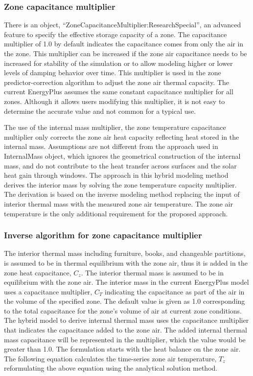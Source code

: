 \subsubsection{Zone capacitance multiplier}\label{zone-capacitance-multiplier}

There is an object, ``ZoneCapacitanceMultiplier:ResearchSpecial'', an advanced feature to specify the effective storage capacity of a zone. The capacitance multiplier of 1.0 by default indicates the capacitance comes from only the air in the zone. This multiplier can be increased if the zone air capacitance needs to be increased for stability of the simulation or to allow modeling higher or lower levels of damping behavior over time. This multiplier is used in the zone predictor-correction algorithm to adjust the zone air thermal capacity. The current EnergyPlus assumes the same constant capacitance multiplier for all zones. Although it allows users modifying this multiplier, it is not easy to determine the accurate value and not common for a typical use.

The use of the internal mass multiplier, the zone temperature capacitance multiplier only corrects the zone air heat capacity reflecting heat stored in the internal mass. Assumptions are not different from the approach used in InternalMass object, which ignores the geometrical construction of the internal mass, and do not contribute to the heat transfer across surfaces and the solar heat gain through windows.  The approach in this hybrid modeling method derives the interior mass by solving the zone temperature capacity multiplier. The derivation is based on the inverse modeling method replacing the input of interior thermal mass with the measured zone air temperature. The zone air temperature is the only additional requirement for the proposed approach.


\subsubsection{Inverse algorithm for zone capacitance multiplier}\label{Inverse-algorithm-for-zone-capacitance-multiplier}

The interior thermal mass including furniture, books, and changeable partitions, is assumed to be in thermal equilibrium with the zone air, thus it is added in the zone heat capacitance, $C_z$.  The interior thermal mass is assumed to be in equilibrium with the zone air. The interior mass in the current EnergyPlus model uses a capacitance multiplier, $C_T$ indicating the capacitance as part of the air in the volume of the specified zone. The default value is given as 1.0 corresponding to the total capacitance for the zone's volume of air at current zone conditions. The hybrid model to derive internal thermal mass uses the capacitance multiplier that indicates the capacitance added to the zone air. The added internal thermal mass capacitance will be represented in the multiplier, which the value would be greater than 1.0. The formulation starts with the heat balance on the zone air. The following equation calculates the time-series zone air temperature, $T_z$ reformulating the above equation using the analytical solution method.

